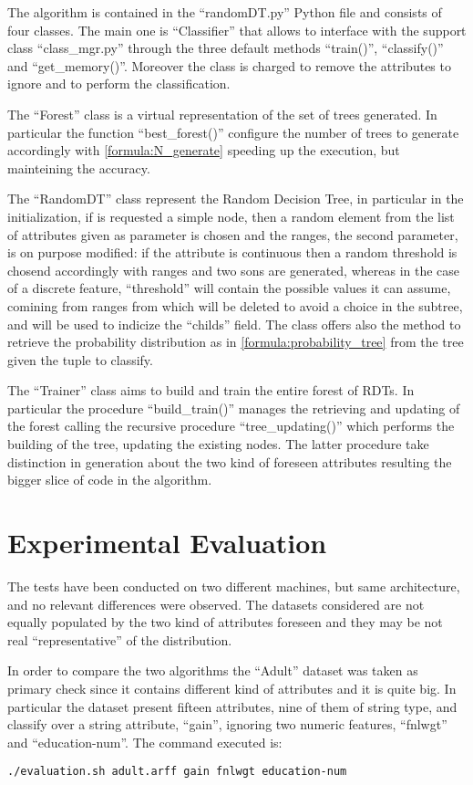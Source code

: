 \documentclass{acm_proc_article-sp-sigmod07}
\begin{document}
The algorithm is contained in the ``randomDT.py'' Python file and consists
of four classes. The main one is ``Classifier'' that allows to interface
with the support class ``class\_mgr.py'' through the three default methods
``train()'', ``classify()'' and ``get\_memory()''. Moreover the class is
charged to remove the attributes to ignore and to perform the
classification.

The ``Forest'' class is a virtual representation of the set of trees
generated. In particular the function ``best\_forest()'' configure the
number of trees to generate accordingly with \ref{formula:N_generate}
speeding up the execution, but mainteining the accuracy.

The ``RandomDT'' class represent the Random Decision Tree, in particular
in the initialization, if is requested a simple node, then a random
element from the list of attributes given as parameter is chosen and the
ranges, the second parameter, is on purpose modified: if the attribute is
continuous then a random threshold is chosend accordingly with
ranges and two sons are generated, whereas in the case of a discrete
feature, ``threshold'' will contain the possible values it can
assume, comining from ranges from which will be deleted to avoid a choice
in the subtree, and will be used to indicize the ``childs'' field.
The class offers also the method to retrieve the probability distribution
as in \ref{formula:probability_tree} from the tree given the tuple to
classify.

The ``Trainer'' class aims to build and train the entire forest of RDTs.
In particular the procedure ``build\_train()'' manages the retrieving and
updating of the forest calling the recursive procedure
``tree\_updating()'' which performs the building of the tree, updating the
existing nodes. The latter procedure take distinction in generation about
the two kind of foreseen attributes resulting the bigger slice of code in
the algorithm.

\section{Experimental Evaluation}
The tests have been conducted on two different machines, but same
architecture, and no relevant differences were observed. The datasets
considered are not equally populated by the two kind of attributes
foreseen and they may be not real ``representative'' of the distribution.

In order to compare the two algorithms the ``Adult'' dataset was taken as
primary check since it contains different kind of attributes and it is
quite big. In particular the dataset present fifteen attributes, nine of
them of string type, and classify over a string attribute, ``gain'',
ignoring two numeric features, ``fnlwgt'' and ``education-num''. The
command executed is:
\begin{verbatim}
./evaluation.sh adult.arff gain fnlwgt education-num
\end{verbatim}
\end{document}
